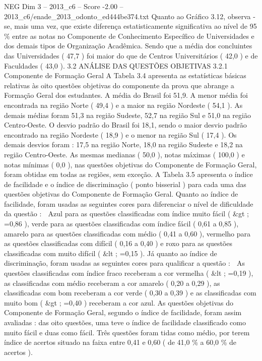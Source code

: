\begin{textsample}{NEG Dim 3 – 2013\_c6 – Score -2.00 – 2013\_c6/enade\_2013\_odonto\_ed444be374.txt}
Quanto ao Gráfico 3.12, observa -se, mais uma vez, que existe diferença estatisticamente significativa ao nível de 95 \% entre as notas no Componente de Conhecimento Específico de Universidades e dos demais tipos de Organização Acadêmica.
Sendo que a média dos concluintes das Universidades ( 47,7 ) foi maior do que de Centros Universitários ( 42,0 ) e de Faculdades ( 43,0 ). 3.2 ANÁLISE DAS QUESTÕES OBJETIVAS 3.2.1 Componente de Formação Geral A Tabela 3.4 apresenta as estatísticas básicas relativas às oito questões objetivas do componente da prova que abrange a Formação Geral dos estudantes.
A média do Brasil foi 51,9.
A menor média foi encontrada na região Norte ( 49,4 ) e a maior na região Nordeste ( 54,1 ).
As demais médias foram 51,3 na região Sudeste, 52,7 na região Sul e 51,0 na região Centro-Oeste.
O desvio padrão do Brasil foi 18,1, sendo o maior desvio padrão encontrado na região Nordeste ( 18,9 ) e o menor na região Sul ( 17,4 ).
Os demais desvios foram : 17,5 na região Norte, 18,0 na região Sudeste e 18,2 na região Centro-Oeste.
As mesmas medianas ( 50,0 ), notas máximas ( 100,0 ) e notas mínimas ( 0,0 ), nas questões objetivas do Componente de Formação Geral, foram obtidas em todas as regiões, sem exceção.
A Tabela 3.5 apresenta o índice de facilidade e o índice de discriminação ( ponto bisserial ) para cada uma das questões objetivas do Componente de Formação Geral.
Quanto ao índice de facilidade, foram usadas as seguintes cores para diferenciar o nível de dificuldade da questão :  Azul para as questões classificadas com índice muito fácil ( \&gt ; =0,86 ), verde para as questões classificadas com índice fácil ( 0,61 a 0,85 ), amarelo para as questões classificadas com médio ( 0,41 a 0,60 ), vermelho para as questões classificadas com difícil ( 0,16 a 0,40 ) e roxo para as questões classificadas com muito difícil ( \&lt ; =0,15 ).
Já quanto ao índice de discriminação, foram usadas as seguintes cores para qualificar a questão :  As questões classificadas com índice fraco receberam a cor vermelha ( \&lt ; =0,19 ), as classificadas com médio receberam a cor amarelo ( 0,20 a 0,29 ), as classificadas com bom receberam a cor verde ( 0,30 a 0,39 ) e as classificadas com muito bom ( \&gt ; =0,40 ) receberam a cor azul.
As questões objetivas do Componente de Formação Geral, segundo o índice de facilidade, foram assim avaliadas : das oito questões, uma teve o índice de facilidade classificado como muito fácil e duas como fácil.
Três questões foram tidas como médio, por terem índice de acertos situado na faixa entre 0,41 e 0,60 ( de 41,0 \% a 60,0 \% de acertos ).

\end{textsample}
